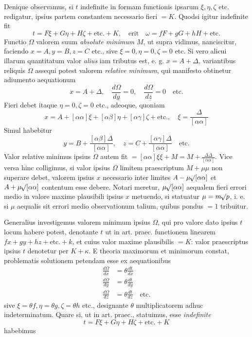 Denique observamus, si \(t\) indefinite in formam functionis ipsarum \(\xi,\eta,\zeta\) etc. redigatur, ipsius partem constantem necessario fieri \(=K\). Quodsi igitur indefinite fit
\[
t=F\xi+G\eta+H\zeta+\text{etc.}+K,\quad\text{erit}\quad\omega=fF+gG+hH+\text{etc.}
\]
Functio \(\Omega\) valorem suum \textit{absolute minimum} \(M\), ut supra vidimus, nanciscitur, faciendo \(x=A,\allowbreak y=B,\allowbreak z=C\) etc., sive \(\xi=0,\allowbreak\eta=0,\allowbreak\zeta=0\) etc. Si vero alicui illarum quantitatum valor \textit{alius} iam tributus est, e. g. \(x=A+\Delta\), variantibus reliquis \(\Omega\) assequi potest valorem \textit{relative minimum}, qui manifesto obtinetur adiumento aequationum
\[
x=A+\Delta,\quad\frac{d\Omega}{dy}=0,\quad\frac{d\Omega}{dz}=0\quad\text{etc.}
\]
Fieri debet itaque \(\eta=0,\zeta=0\) etc., adeoque, quoniam
\[
x=A+[\alpha\alpha]\xi+[\alpha\beta]\eta+[\alpha\gamma]\zeta+\text{etc.},\quad\xi=\frac{\Delta}{[\alpha\alpha]}
\]
Simul habebitur
\[
y=B+\frac{[\alpha\beta]\Delta}{[\alpha\alpha]},\quad z=C+\frac{[\alpha\gamma]\Delta}{[\alpha\alpha]}\quad\text{etc.}
\]
Valor relative minimus ipsius \(\Omega\) autem fit \(=[\alpha\alpha]\xi\xi+M=M+\frac{\Delta\Delta}{[\alpha\alpha]}\). Vice versa hinc colligimus, si valor ipsius \(\Omega\) limitem praescriptum \(M+\mu\mu\) non superare debet, valorem ipsius \(x\) necessario inter limites \(A-\mu\mathord{{}^{}\!\surd}[\alpha\alpha]\) et \(A+\mu\mathord{{}^{}\!\surd}[\alpha\alpha]\) contentum esse debere. Notari meretur, \(\mu\mathord{{}^{}\!\surd}[\alpha\alpha]\) aequalem fieri errori medio in valore maxime plausibili ipsius \(x\) metuendo, si statuatur \(\mu=m\mathord{{}^{}\!\surd}p\), i. e. si \(\mu\) aequalis sit errori medio observationum talium, quibus pondus \(=1\) tribuitur.

Generalius investigemus valorem minimum ipsius \(\Omega\), qui pro valore dato ipsius \(t\) locum habere potest, denotante \(t\) ut in art. praec. functionem linearem \(fx+gy+hz+\text{etc.}+k\), et cuius valor maxime plausibilis \(=K\): valor praescriptus ipsius \(t\) denotetur per \(K+\kappa\). E theoria maximorum et minimorum constat, problematis solutionem petendam esse ex aequationibus
\[
\begin{aligned}
\frac{d\Omega}{dx}&=\theta\frac{dt}{dx}\\[3pt]
\frac{d\Omega}{dy}&=\theta\frac{dt}{dy}\\[3pt]
\frac{d\Omega}{dz}&=\theta\frac{dt}{dz}\quad\text{etc.}
\end{aligned}
\]
sive \(\xi=\theta f,\allowbreak\eta=\theta g,\allowbreak\zeta=\theta h\) etc., designante \(\theta\) multiplicatorem adhuc indeterminatum. Quare si, ut in art. praec., statuimus, esse \textit{indefinite}
\[
t=F\xi+G\eta+H\zeta+\text{etc.}+K
\]
habebimus
